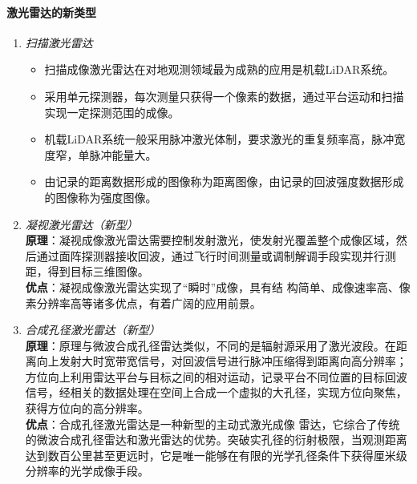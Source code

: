 \paragraph{激光雷达的新类型}\begin{enumerate}
	\item \textit{扫描激光雷达}\begin{itemize}
		\item 扫描成像激光雷达在对地观测领域最为成熟的应用是机载LiDAR系统。
		\item 采用单元探测器，每次测量只获得一个像素的数据，通过平台运动和扫描实现一定探测范围的成像。
		\item 机载LiDAR系统一般采用脉冲激光体制，要求激光的重复频率高，脉冲宽度窄，单脉冲能量大。
		\item 由记录的距离数据形成的图像称为距离图像，由记录的回波强度数据形成的图像称为强度图像。
	\end{itemize}
	\item \textit{凝视激光雷达（新型）}\\
	\textbf{原理}：凝视成像激光雷达需要控制发射激光，使发射光覆盖整个成像区域，然后通过面阵探测器接收回波，通过飞行时间测量或调制解调手段实现并行测距，得到目标三维图像。\\
	\textbf{优点}：凝视成像激光雷达实现了“瞬时”成像，具有结 构简单、成像速率高、像素分辨率高等诸多优点，有着广阔的应用前景。
	\item \textit{合成孔径激光雷达（新型）}\\
	\textbf{原理}：原理与微波合成孔径雷达类似，不同的是辐射源采用了激光波段。在距离向上发射大时宽带宽信号，对回波信号进行脉冲压缩得到距离向高分辨率；方位向上利用雷达平台与目标之间的相对运动，记录平台不同位置的目标回波信号，经相关的数据处理在空间上合成一个虚拟的大孔径，实现方位向聚焦，获得方位向的高分辨率。\\
	\textbf{优点}：合成孔径激光雷达是一种新型的主动式激光成像 雷达，它综合了传统的微波合成孔径雷达和激光雷达的优势。突破实孔径的衍射极限，当观测距离达到数百公里甚至更远时，它是唯一能够在有限的光学孔径条件下获得厘米级分辨率的光学成像手段。
\end{enumerate}

